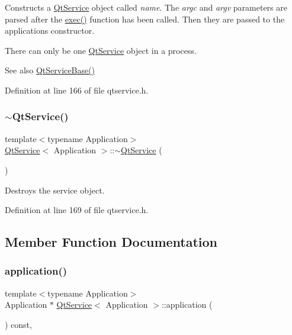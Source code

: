 Constructs a \mbox{\hyperlink{class_qt_service}{Qt\+Service}} object called {\itshape name}. The {\itshape argc} and {\itshape argv} parameters are parsed after the \mbox{\hyperlink{class_qt_service_base_afae2e589de71c1ae3ae8db3dc9ab9c64}{exec()}} function has been called. Then they are passed to the application\textquotesingle{}s constructor.

There can only be one \mbox{\hyperlink{class_qt_service}{Qt\+Service}} object in a process.

\begin{DoxySeeAlso}{See also}
\mbox{\hyperlink{class_qt_service_base_a75e3f82739df6dc0b9aa899b3f9552eb}{Qt\+Service\+Base()}} 
\end{DoxySeeAlso}


Definition at line 166 of file qtservice.\+h.

\mbox{\label{class_qt_service_a96af408261dfa13bd8034f67949d6c2d}} 
\subsubsection{\texorpdfstring{$\sim$\+Qt\+Service()}{~QtService()}}
{\footnotesize\ttfamily template$<$typename Application$>$ \\
\mbox{\hyperlink{class_qt_service}{Qt\+Service}}$<$ Application $>$\+::$\sim$\mbox{\hyperlink{class_qt_service}{Qt\+Service}} (\begin{DoxyParamCaption}{ }\end{DoxyParamCaption})\hspace{0.3cm}{\ttfamily [inline]}}

Destroys the service object. 

Definition at line 169 of file qtservice.\+h.



\subsection{Member Function Documentation}
\mbox{\label{class_qt_service_a39743415a6ece5c7c6e6b5b01289c00b}} 
\subsubsection{\texorpdfstring{application()}{application()}}
{\footnotesize\ttfamily template$<$typename Application$>$ \\
Application $\ast$ \mbox{\hyperlink{class_qt_service}{Qt\+Service}}$<$ Application $>$\+::application (\begin{DoxyParamCaption}{ }\end{DoxyParamCaption}) const\hspace{0.3cm}{\ttfamily [inline]}, {\ttfamily [protected]}}


